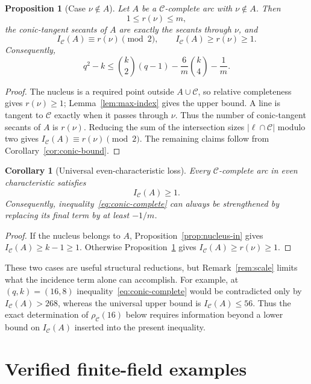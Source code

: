 \documentclass[11pt]{article}
\newtheorem{proposition}[theorem]{Proposition}
\newtheorem{corollary}[theorem]{Corollary}
\theoremstyle{definition}
\theoremstyle{remark}
\newcommand{\cC}{\mathcal{C}}
\newcommand{\IC}{I_{\cC}}
\newcommand{\rhoC}{\rho_{\cC}}
\begin{document}
\begin{proposition}[Case $\nu\notin A$]
\label{prop:nucleus-out}
Let $A$ be a $\cC$-complete arc with $\nu\notin A$.  Then
\[
 1\le r(\nu)\le m,
\]
the conic-tangent secants of $A$ are exactly the secants through $\nu$, and
\[
 \IC(A)\equiv r(\nu)\pmod2,
 \qquad
 \IC(A)\ge r(\nu)\ge1.
\]
Consequently,
\begin{equation}
 q^2-k\le
 \binom{k}{2}(q-1)-\frac6m\binom{k}{4}-\frac1m.
\label{eq:nucleus-out}
\end{equation}
\end{proposition}

\begin{proof}
The nucleus is a required point outside $A\cup\cC$, so relative
completeness gives $r(\nu)\ge1$; Lemma~\ref{lem:max-index} gives the upper
bound.  A line is tangent to $\cC$ exactly when it passes through $\nu$.
Thus the number of conic-tangent secants of $A$ is $r(\nu)$.  Reducing the
sum of the intersection sizes $|\ell\cap\cC|$ modulo two gives
$\IC(A)\equiv r(\nu)\pmod2$.  The remaining claims follow from
Corollary~\ref{cor:conic-bound}.
\end{proof}

\begin{corollary}[Universal even-characteristic loss]
\label{cor:even-loss}
Every $\cC$-complete arc in even characteristic satisfies
\[
 \IC(A)\ge1.
\]
Consequently, inequality~\eqref{eq:conic-complete} can always be strengthened
by replacing its final term by at least $-1/m$.
\end{corollary}

\begin{proof}
If the nucleus belongs to $A$, Proposition~\ref{prop:nucleus-in} gives
$\IC(A)\ge k-1\ge1$.  Otherwise Proposition~\ref{prop:nucleus-out} gives
$\IC(A)\ge r(\nu)\ge1$.
\end{proof}

These two cases are useful structural reductions, but
Remark~\ref{rem:scale} limits what the incidence term alone can accomplish.
For example, at $(q,k)=(16,8)$ inequality~\eqref{eq:conic-complete} would
be contradicted only by $\IC(A)>268$, whereas the universal upper bound is
$\IC(A)\le56$.  Thus the exact determination of $\rhoC(16)$ below requires
information beyond a lower bound on $\IC(A)$ inserted into the present
inequality.

\section{Verified finite-field examples}
\label{sec:examples}
\end{document}
